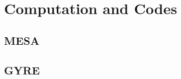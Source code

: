 \section{Computation and Codes}
    
    
{\color{green}    
\subsection{MESA}



}    
    
    
{\color{brown}    
\subsection{GYRE}
    

}    